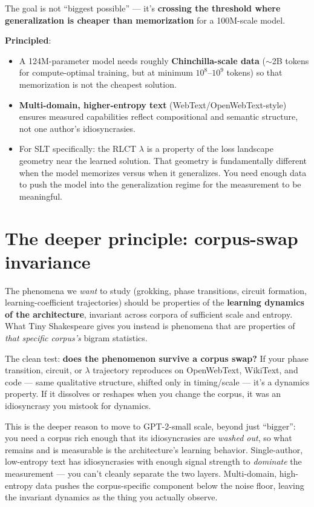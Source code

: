 \documentclass[11pt]{article}
\begin{document}
The goal is not ``biggest possible'' --- it's \textbf{crossing the threshold where generalization is cheaper than memorization} for a 100M-scale model.

\textbf{Principled}:
\begin{itemize}[leftmargin=*]
\item A 124M-parameter model needs roughly \textbf{Chinchilla-scale data} ($\sim$2B tokens for compute-optimal training, but at minimum $10^8$--$10^9$ tokens) so that memorization is not the cheapest solution.
\item \textbf{Multi-domain, higher-entropy text} (WebText/OpenWebText-style) ensures measured capabilities reflect compositional and semantic structure, not one author's idiosyncrasies.
\item For SLT specifically: the RLCT $\lambda$ is a property of the loss landscape geometry near the learned solution. That geometry is fundamentally different when the model memorizes versus when it generalizes. You need enough data to push the model into the generalization regime for the measurement to be meaningful.
\end{itemize}

\section{The deeper principle: corpus-swap invariance}

The phenomena we \emph{want} to study (grokking, phase transitions, circuit formation, learning-coefficient trajectories) should be properties of the \textbf{learning dynamics of the architecture}, invariant across corpora of sufficient scale and entropy. What Tiny Shakespeare gives you instead is phenomena that are properties of \emph{that specific corpus's} bigram statistics.

The clean test: \textbf{does the phenomenon survive a corpus swap?} If your phase transition, circuit, or $\lambda$ trajectory reproduces on OpenWebText, WikiText, and code --- same qualitative structure, shifted only in timing/scale --- it's a dynamics property. If it dissolves or reshapes when you change the corpus, it was an idiosyncrasy you mistook for dynamics.

This is the deeper reason to move to GPT-2-small scale, beyond just ``bigger'': you need a corpus rich enough that its idiosyncrasies are \emph{washed out}, so what remains and is measurable is the architecture's learning behavior. Single-author, low-entropy text has idiosyncrasies with enough signal strength to \emph{dominate} the measurement --- you can't cleanly separate the two layers. Multi-domain, high-entropy data pushes the corpus-specific component below the noise floor, leaving the invariant dynamics as the thing you actually observe.
\end{document}

